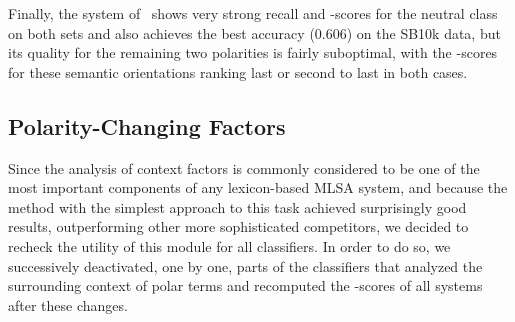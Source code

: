 Finally, the system of~\citet{Kolchyna:15} shows very strong recall
and \F{}-scores for the neutral class on both sets and also achieves
the best accuracy (0.606) on the SB10k data, but its quality for the
remaining two polarities is fairly suboptimal, with the \F{}-scores
for these semantic orientations ranking last or second to last in both
cases.

\subsection{Polarity-Changing Factors}\label{subsec:cgsa:lex-methods:pol-change}

Since the analysis of context factors is commonly considered to be one
of the most important components of any lexicon-based MLSA system, and
because the method with the simplest approach to this task achieved
surprisingly good results, outperforming other more sophisticated
competitors, we decided to recheck the utility of this module for all
classifiers.  In order to do so, we successively deactivated, one by
one, parts of the classifiers that analyzed the surrounding context of
polar terms and recomputed the \F{}-scores of all systems after these
changes.

